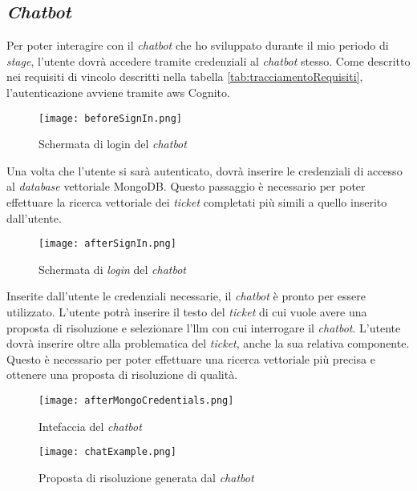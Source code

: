 \subsection*{\textit{Chatbot}}
Per poter interagire con il \textit{chatbot} che ho sviluppato durante il mio periodo di \textit{stage}, l'utente dovrà accedere tramite credenziali al \textit{chatbot} stesso. 
Come descritto nei requisiti di vincolo descritti nella tabella \ref{tab:tracciamentoRequisiti}, l'autenticazione avviene tramite \gls{aws} Cognito. 
\begin{figure}[H]
    \centering
    \texttt{[image: beforeSignIn.png]}
    \caption{Schermata di login del \textit{chatbot}}
    \label{fig:loginChatbot}
\end{figure}
\noindent
Una volta che l'utente si sarà autenticato, dovrà inserire le credenziali di accesso al \textit{database} vettoriale MongoDB. Questo passaggio è necessario per poter effettuare la ricerca vettoriale dei \textit{ticket} completati più simili a quello inserito dall'utente.
\begin{figure}[H]
    \centering
    \texttt{[image: afterSignIn.png]}
    \caption{Schermata di \textit{login} del \textit{chatbot}}
    \label{fig:afterSignIn}
\end{figure}
\noindent
Inserite dall'utente le credenziali necessarie, il \textit{chatbot} è pronto per essere utilizzato. L'utente potrà inserire il testo del \textit{ticket} di cui vuole avere una proposta di risoluzione e selezionare l'\gls{llm} con cui interrogare il \textit{chatbot}. L'utente dovrà inserire oltre alla problematica del \textit{ticket}, anche la sua relativa componente. Questo è necessario per poter effettuare una ricerca vettoriale più precisa e ottenere una proposta di risoluzione di qualità.
\begin{figure}[H]
    \centering
    \texttt{[image: afterMongoCredentials.png]}
    \caption{Intefaccia del \textit{chatbot} }
    \label{fig:chatbot}
\end{figure}

\begin{figure} [H]
    \centering
    \texttt{[image: chatExample.png]}
    \caption{Proposta di risoluzione generata dal \textit{chatbot}}
    \label{fig:chatbotResponse}
\end{figure}

